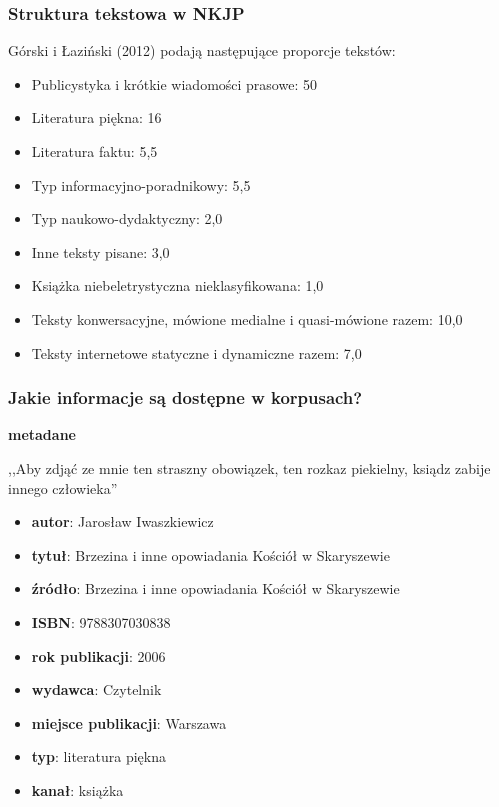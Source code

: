 \documentclass{beamer}
\begin{document}
\begin{frame}
  \large
  \frametitle{Struktura tekstowa w NKJP}
  Górski i Łaziński (2012) podają następujące proporcje tekstów:
  \begin{itemize}
  \item Publicystyka i krótkie wiadomości prasowe: 50%
  \item Literatura piękna: 16%
  \item Literatura faktu: 5,5%
  \item Typ informacyjno-poradnikowy: 5,5%
  \item Typ naukowo-dydaktyczny: 2,0%
  \item Inne teksty pisane: 3,0%
  \item Książka niebeletrystyczna nieklasyfikowana: 1,0%
  \item Teksty konwersacyjne, mówione medialne i quasi-mówione razem: 10,0%
  \item Teksty internetowe statyczne i dynamiczne razem: 7,0%
  \end{itemize}
\end{frame}

\begin{frame}
  \frametitle{Jakie informacje są dostępne w korpusach?}
  \vspace{0.5em}
  {\Large \textbf{metadane}}
  \vspace{0.5em}

  ,,Aby zdjąć ze mnie ten straszny obowiązek, ten rozkaz piekielny, ksiądz zabije innego człowieka''
  {\footnotesize
  \begin{itemize}
\item \textbf{autor}: Jarosław Iwaszkiewicz
\item \textbf{tytuł}: Brzezina i inne opowiadania Kościół w Skaryszewie
\item \textbf{źródło}: Brzezina i inne opowiadania Kościół w Skaryszewie
\item \textbf{ISBN}: 9788307030838
\item \textbf{rok publikacji}: 2006
\item \textbf{wydawca}: Czytelnik
\item \textbf{miejsce publikacji}: Warszawa
\item \textbf{typ}: literatura piękna
\item \textbf{kanał}: książka
  \end{itemize}
  }

\end{frame}
\end{document}
